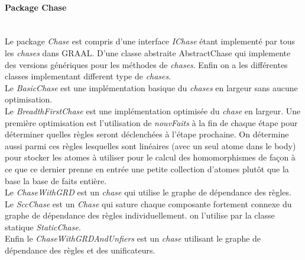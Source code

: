         \paragraph{Package Chase}\ \\
        Le package \textit{Chase} est compris d'une interface \textit{IChase} étant implementé par tous les \textit{chases} dans GRAAL. D'une classe abstraite AbstractChase qui implemente des versions génériques pour les méthodes de \textit{chases}. Enfin on a les différentes classes implementant different type de \textit{chases}.\\
        Le \textit{BasicChase} est une implémentation basique du \textit{chases} en largeur sans aucune optimisation. \\
        Le \textit{BreadthFirstChase} est une implémentation optimisée du \textit{chase} en largeur. Une première optimisation est l'utilisation de \textit{nouvFaits} à la fin de chaque étape pour déterminer quelles règles seront déclenchées à l'étape prochaine. On détermine aussi parmi ces règles lesquelles sont linéaires (avec un seul atome dans le body) pour stocker les atomes à utiliser pour le calcul des homomorphismes de façon à ce que ce dernier prenne en entrée une petite collection d'atomes plutôt que la base la base de faits entière. \\
        Le \textit{ChaseWithGRD} est un \textit{chase} qui utilise le graphe de dépendance des règles.\\
        Le \textit{SccChase} est un \textit{Chase} qui sature chaque composante fortement connexe du graphe de dépendance des règles individuellement. on l'utilise par la classe statique \textit{StaticChase}.\\
        Enfin le \textit{ChaseWithGRDAndUnfiers} est un \textit{chase} utilisant le graphe de dépendance des règles et des unificateurs.
        
